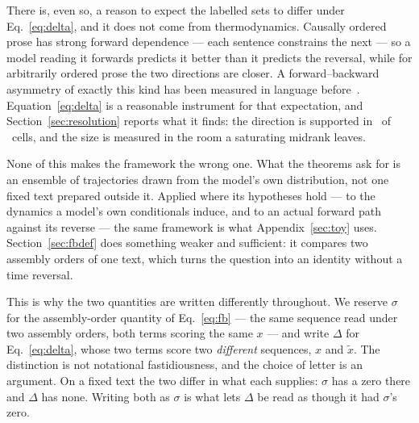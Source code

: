 \documentclass[11pt]{article}
\begin{document}
There is, even so, a reason to expect the labelled sets to differ under
Eq.~\eqref{eq:delta}, and it does not come from thermodynamics.  Causally
ordered prose has strong forward dependence --- each sentence constrains the
next --- so a model reading it forwards predicts it better than it predicts
the reversal, while for arbitrarily ordered prose the two directions are
closer.  A forward--backward asymmetry of exactly this kind has been
measured in language before~\cite{arrow}.  Equation~\eqref{eq:delta} is a
reasonable instrument for that expectation, and
Section~\ref{sec:resolution} reports what it finds: the direction is
supported in \ContrastNPositive\ of \ContrastNCells\ cells, and the size
is measured in the room a saturating midrank
leaves.

None of this makes the framework the wrong one.  What the theorems ask for
is an ensemble of trajectories drawn from the model's own distribution, not
one fixed text prepared outside it.  Applied where its
hypotheses hold --- to the dynamics a model's own conditionals induce, and to
an actual forward path against its reverse --- the same framework is what
Appendix~\ref{sec:toy} uses.  Section~\ref{sec:fbdef} does something
weaker and sufficient: it compares two assembly orders of one text, which
turns the question into an identity without a time reversal.

This is why the two quantities are written differently throughout.  We
reserve $\sigma$ for the assembly-order quantity of Eq.~\eqref{eq:fb} --- the
same sequence read under two assembly orders, both terms scoring the same
$x$
--- and write $\Delta$ for Eq.~\eqref{eq:delta}, whose two terms score two
\emph{different} sequences, $x$ and $\tilde{x}$.  The distinction is not
notational fastidiousness, and the choice of letter is an argument.  On a
fixed text the two differ in what each supplies: $\sigma$ has a zero there
and $\Delta$ has none.  Writing both as $\sigma$ is what lets $\Delta$ be
read as though it had $\sigma$'s zero.
\end{document}
